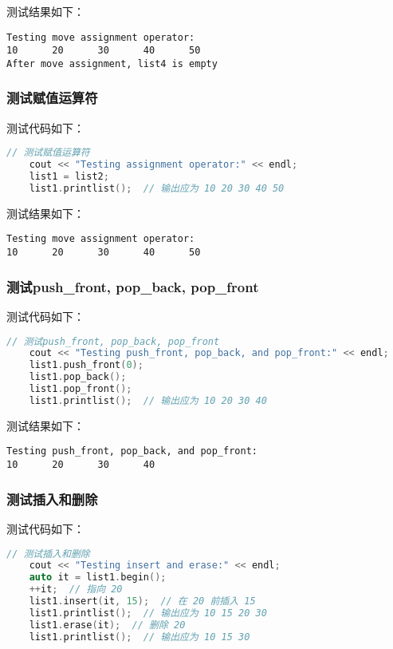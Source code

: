 \documentclass[fontset=fandol]{ctexart}
\begin{document}
测试结果如下：
\begin{verbatim}  
Testing move assignment operator:
10      20      30      40      50
After move assignment, list4 is empty
\end{verbatim}

\subsubsection{测试赋值运算符}
测试代码如下：
\begin{lstlisting}[language=C++, caption={测试赋值运算符}]  
// 测试赋值运算符  
    cout << "Testing assignment operator:" << endl;  
    list1 = list2;  
    list1.printlist();  // 输出应为 10 20 30 40 50
\end{lstlisting}

测试结果如下：
\begin{verbatim}  
Testing move assignment operator:
10      20      30      40      50
\end{verbatim}

\subsubsection{测试push\_front, pop\_back, pop\_front}
测试代码如下：
\begin{lstlisting}[language=C++, caption={测试赋值运算符}]  
// 测试push_front, pop_back, pop_front  
    cout << "Testing push_front, pop_back, and pop_front:" << endl;  
    list1.push_front(0);  
    list1.pop_back();  
    list1.pop_front();  
    list1.printlist();  // 输出应为 10 20 30 40
\end{lstlisting}

测试结果如下：
\begin{verbatim}  
Testing push_front, pop_back, and pop_front:
10      20      30      40
\end{verbatim}

\subsubsection{测试插入和删除}
测试代码如下：
\begin{lstlisting}[language=C++, caption={测试插入和删除}]  
// 测试插入和删除  
    cout << "Testing insert and erase:" << endl;  
    auto it = list1.begin();  
    ++it;  // 指向 20  
    list1.insert(it, 15);  // 在 20 前插入 15  
    list1.printlist();  // 输出应为 10 15 20 30  
    list1.erase(it);  // 删除 20  
    list1.printlist();  // 输出应为 10 15 30
\end{lstlisting}
\end{document}
